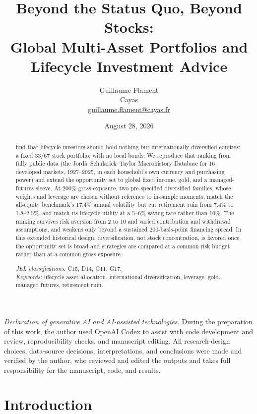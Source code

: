 \documentclass[11pt]{article}
\title{\textbf{Beyond the Status Quo, Beyond Stocks:\\Global Multi-Asset Portfolios and Lifecycle Investment Advice}}
\author{Guillaume Flament\\[2pt]
\normalsize Cayas\\[1pt]
\normalsize \href{mailto:guillaume.flament@cayas.fr}{guillaume.flament@cayas.fr}}
\date{August 28, 2026}
\begin{document}
\maketitle

\begin{abstract}
\noindent
\citet{AnarkulovaCederburgODoherty2025} find that lifecycle investors should
hold nothing but internationally diversified equities: a fixed 33/67 stock
portfolio, with no local bonds. We reproduce that ranking from fully public
data (the Jord{\`a}--Schularick--Taylor Macrohistory Database
\citep{MacrohistoryDB} for 16 developed markets, 1927--2025, in each household's
own currency and purchasing power) and extend the opportunity set to global
fixed income, gold, and a managed-futures sleeve. At 200\% gross
exposure, two pre-specified diversified families, whose weights and leverage
are chosen without reference to in-sample moments, match the all-equity
benchmark's 17.4\% annual
volatility but cut retirement ruin from 7.4\% to 1.8--2.5\%, and match its
lifecycle utility at a 5--6\% saving rate rather than 10\%. The ranking survives
risk aversion from 2 to 10 and varied contribution and withdrawal assumptions,
and weakens only beyond a sustained 200-basis-point financing spread. In this
extended historical design, diversification, not stock concentration, is favored
once the opportunity set is broad and strategies are compared at a common risk
budget rather than at a common gross exposure.

\medskip
\noindent \textit{JEL classifications:} C15, D14, G11, G17.\\
\noindent \textit{Keywords:} lifecycle asset allocation, international
diversification, leverage, gold, managed futures, retirement ruin.
\end{abstract}

\medskip
\noindent\textit{Declaration of generative AI and AI-assisted technologies.}
During the preparation of this work, the author used OpenAI Codex to assist
with code development and review, reproducibility checks, and manuscript
editing. All research-design choices, data-source decisions, interpretations,
and conclusions were made and verified by the author, who reviewed and edited
the outputs and takes full responsibility for the manuscript, code, and
results.

\newpage

\section{Introduction}
\end{document}
